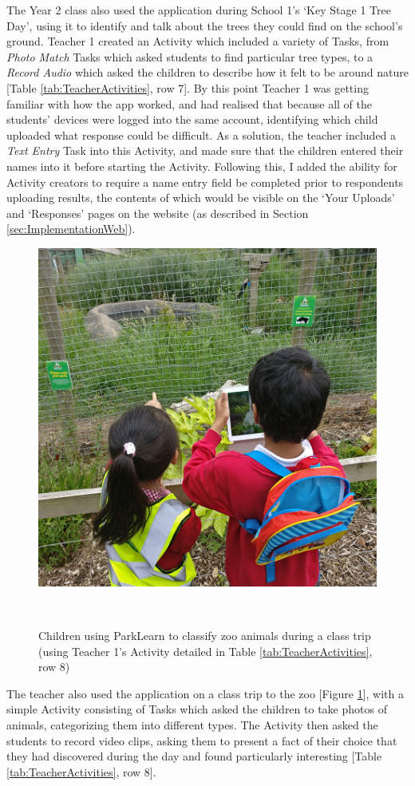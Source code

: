 The Year 2 class also used the application during School 1's `Key Stage 1 Tree Day', using it to identify and talk about the trees they could find on the school's ground. Teacher 1 created an Activity which included a variety of Tasks, from \textit{Photo Match} Tasks which asked students to find particular tree types, to a \textit{Record Audio} which asked the children to describe how it felt to be around nature [Table \ref{tab:TeacherActivities}, row 7]. By this point Teacher 1 was getting familiar with how the app worked, and had realised that because all of the students' devices were logged into the same account, identifying which child uploaded what response could be difficult. As a solution, the teacher included a \textit{Text Entry} Task into this Activity, and made sure that the children entered their names into it before starting the Activity. Following this, I added the ability for Activity creators to require a name entry field be completed prior to respondents uploading results, the contents of which would be visible on the `Your Uploads' and `Responses' pages on the website (as described in Section \ref{sec:ImplementationWeb}).

\begin{figure}
  \centering
  \includegraphics[width=0.6\columnwidth]{images/chapter07/zoo.jpg}
  \caption[Children using ParkLearn during a class trip to the zoo]{Children using ParkLearn to classify zoo animals during a class trip (using Teacher 1's Activity detailed in Table \ref{tab:TeacherActivities}, row 8)}~\label{fig:ParkLearnZoo}
\end{figure}

The teacher also used the application on a class trip to the zoo [Figure \ref{fig:ParkLearnZoo}], with a simple Activity consisting of Tasks which asked the children to take photos of animals, categorizing them into different types. The Activity then asked the students to record video clips, asking them to present a fact of their choice that they had discovered during the day and found particularly interesting [Table \ref{tab:TeacherActivities}, row 8].

